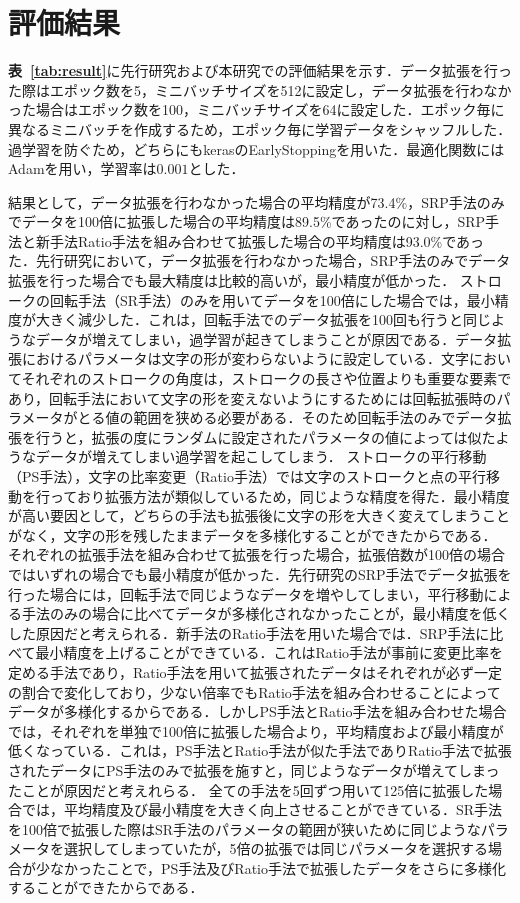 \section{評価結果}
\label{sec:ev_ result}
 \textbf{表~\ref{tab:result}}に先行研究および本研究での評価結果を示す．データ拡張を行った際はエポック数を5，ミニバッチサイズを512に設定し，データ拡張を行わなかった場合はエポック数を100，ミニバッチサイズを64に設定した．エポック毎に異なるミニバッチを作成するため，エポック毎に学習データをシャッフルした．過学習を防ぐため，どちらにもkerasのEarlyStopping\cite{earlystopping}を用いた．最適化関数にはAdam\cite{kingma14:adam}を用い，学習率は$0.001$とした．

 結果として，データ拡張を行わなかった場合の平均精度が73.4\%，SRP手法のみでデータを100倍に拡張した場合の平均精度は89.5\%であったのに対し，SRP手法と新手法Ratio手法を組み合わせて拡張した場合の平均精度は93.0\%であった．先行研究\cite{takahashi}において，データ拡張を行わなかった場合，SRP手法のみでデータ拡張を行った場合でも最大精度は比較的高いが，最小精度が低かった．
ストロークの回転手法（SR手法）のみを用いてデータを100倍にした場合では，最小精度が大きく減少した．これは，回転手法でのデータ拡張を100回も行うと同じようなデータが増えてしまい，過学習が起きてしまうことが原因である．データ拡張におけるパラメータは文字の形が変わらないように設定している．文字においてそれぞれのストロークの角度は，ストロークの長さや位置よりも重要な要素であり，回転手法において文字の形を変えないようにするためには回転拡張時のパラメータがとる値の範囲を狭める必要がある．そのため回転手法のみでデータ拡張を行うと，拡張の度にランダムに設定されたパラメータの値によっては似たようなデータが増えてしまい過学習を起こしてしまう．
ストロークの平行移動（PS手法），文字の比率変更（Ratio手法）では文字のストロークと点の平行移動を行っており拡張方法が類似しているため，同じような精度を得た．最小精度が高い要因として，どちらの手法も拡張後に文字の形を大きく変えてしまうことがなく，文字の形を残したままデータを多様化することができたからである．
それぞれの拡張手法を組み合わせて拡張を行った場合，拡張倍数が100倍の場合ではいずれの場合でも最小精度が低かった．先行研究\cite{takahashi}のSRP手法でデータ拡張を行った場合には，回転手法で同じようなデータを増やしてしまい，平行移動による手法のみの場合に比べてデータが多様化されなかったことが，最小精度を低くした原因だと考えられる．新手法のRatio手法を用いた場合では．SRP手法に比べて最小精度を上げることができている．これはRatio手法が事前に変更比率を定める手法であり，Ratio手法を用いて拡張されたデータはそれぞれが必ず一定の割合で変化しており，少ない倍率でもRatio手法を組み合わせることによってデータが多様化するからである．しかしPS手法とRatio手法を組み合わせた場合では，それぞれを単独で100倍に拡張した場合より，平均精度および最小精度が低くなっている．これは，PS手法とRatio手法が似た手法でありRatio手法で拡張されたデータにPS手法のみで拡張を施すと，同じようなデータが増えてしまったことが原因だと考えれらる．
全ての手法を5回ずつ用いて125倍に拡張した場合では，平均精度及び最小精度を大きく向上させることができている．SR手法を100倍で拡張した際はSR手法のパラメータの範囲が狭いために同じようなパラメータを選択してしまっていたが，5倍の拡張では同じパラメータを選択する場合が少なかったことで，PS手法及びRatio手法で拡張したデータをさらに多様化することができたからである．

